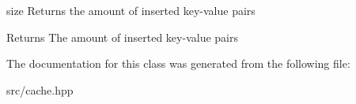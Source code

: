 size Returns the amount of inserted key-\/value pairs 

\begin{DoxyReturn}{Returns}
The amount of inserted key-\/value pairs 
\end{DoxyReturn}


The documentation for this class was generated from the following file\+:\begin{DoxyCompactItemize}
\item 
src/cache.\+hpp\end{DoxyCompactItemize}
